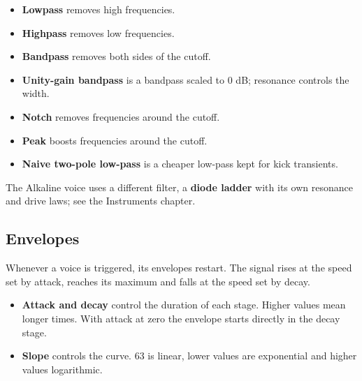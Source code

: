 \begin{itemize}
\tightlist
\item
  \textbf{Lowpass} removes high frequencies.
\item
  \textbf{Highpass} removes low frequencies.
\item
  \textbf{Bandpass} removes both sides of the cutoff.
\item
  \textbf{Unity-gain bandpass} is a bandpass scaled to 0 dB; resonance
  controls the width.
\item
  \textbf{Notch} removes frequencies around the cutoff.
\item
  \textbf{Peak} boosts frequencies around the cutoff.
\item
  \textbf{Naive two-pole low-pass} is a cheaper low-pass kept for kick
  transients.
\end{itemize}

The Alkaline voice uses a different filter, a \textbf{diode ladder} with
its own resonance and drive laws; see the Instruments chapter.

\subsection{Envelopes}\label{envelopes}

Whenever a voice is triggered, its envelopes restart. The signal rises
at the speed set by attack, reaches its maximum and falls at the speed
set by decay.


\begin{itemize}
\tightlist
\item
  \textbf{Attack and decay} control the duration of each stage. Higher
  values mean longer times. With attack at zero the envelope starts
  directly in the decay stage.
\item
  \textbf{Slope} controls the curve. 63 is linear, lower values are
  exponential and higher values logarithmic.
\end{itemize}



